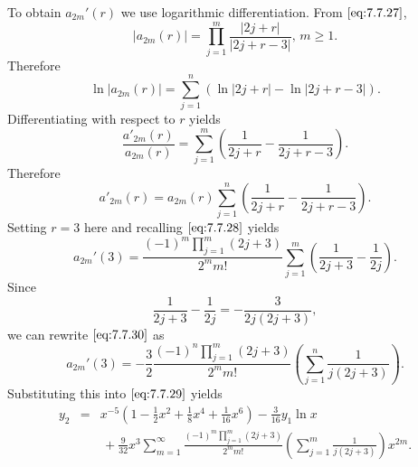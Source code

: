 \documentclass{ximera}
\begin{document}
\begin{example}
\begin{explanation}
To obtain $a_{2m}'(r)$  we use logarithmic differentiation. From
$\eqref{eq:7.7.27}$,
$$
|a_{2m}(r)|=\prod_{j=1}^m\frac{|2j+r|}{|2j+r-3|},\,m\geq 1.
$$
Therefore
$$
\ln |a_{2m}(r)|=\sum^n_{j=1} \left(\ln |2j+r|-\ln|2j+r-3|\right).
$$
Differentiating  with respect to $r$ yields
$$
\frac{a'_{2m}(r)}{a_{2m}(r)}=\sum^m_{j=1} \left(\frac{1}{2j+r}-\frac{1}{2j+r-3}\right).
$$
Therefore
$$
a'_{2m}(r)=a_{2m}(r) \sum^n_{j=1} \left(\frac{1}{2j+r}-\frac{1}{2j+r-3}\right).
$$
Setting $r=3$ here and recalling $\eqref{eq:7.7.28}$ yields
\begin{equation} \label{eq:7.7.30}
a_{2m}'(3)=\frac{(-1)^m\prod_{j=1}^m(2j+3)}{2^mm!}\sum_{j=1}^m
\left(\frac{1}{2j+3}-\frac{1}{2j}\right).
\end{equation}
Since
$$
\frac{1}{2j+3}-\frac{1}{2j}=-\frac{3}{2j(2j+3)},
$$
we can rewrite $\eqref{eq:7.7.30}$ as
$$
a_{2m}'(3)=-\frac{3}{2}\frac{(-1)^n\prod_{j=1}^m(2j+3)}{2^mm!}
\left(\sum_{j=1}^n\frac{1}{j(2j+3)}\right).
$$
Substituting this into $\eqref{eq:7.7.29}$ yields
\begin{eqnarray*}
y_2&=&x^{-5}
\left(1-\frac{1}{2}x^2+\frac{1}{8}x^4+\frac{1}{16}x^6\right)
-\frac{3}{16}y_1\ln x \\
&&\, +\frac{9}{32}
x^3\sum_{m=1}^\infty
\frac{(-1)^m\prod_{j=1}^m(2j+3)}{2^mm!}\left(\sum_{j=1}^m\frac{1}{j(2j+3)}\right) x^{2m}.
\end{eqnarray*}
\end{explanation}
\end{example}
\end{document}
